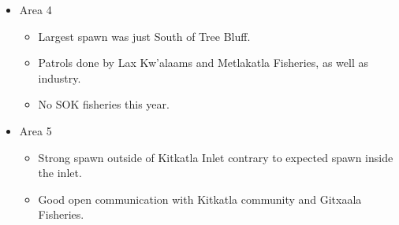 \begin{itemize}

\item Area 4

\begin{itemize}

\item Largest spawn was just South of Tree Bluff.

\item Patrols done by Lax Kw'alaams and Metlakatla Fisheries,
as well as industry.

\item No SOK fisheries this year.

\end{itemize}

\item Area 5

\begin{itemize}

\item Strong spawn outside of Kitkatla Inlet
contrary to expected spawn inside the inlet.

\item Good open communication with Kitkatla community and Gitxaala Fisheries.

\end{itemize}

\end{itemize}
